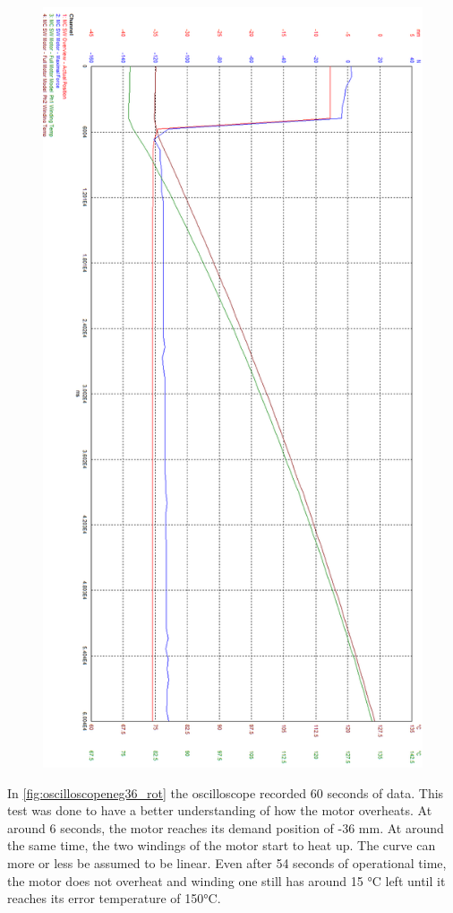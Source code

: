 \begin{figure}
	\centering
	\includegraphics[width=0.7\linewidth]{pictures_figures/oscilloscope_neg36_rot}
	\caption{}
	\label{fig:oscilloscopeneg36rot}
\end{figure}


In \cref{fig:oscilloscopeneg36_rot} the oscilloscope recorded 60 seconds of data. This test was done to have a better understanding of how the motor overheats. At around 6 seconds, the motor reaches its demand position of -36 mm. At around the same time, the two windings of the motor start to heat up. The curve can more or less be assumed to be linear. Even after 54 seconds of operational time, the motor does not overheat and winding one still has around 15 °C left until it reaches its error temperature of 150°C. 

